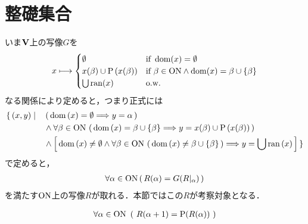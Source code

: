 \section{整礎集合}
	いま$\mathbf{V}$上の写像$G$を
	\begin{align}
		x \longmapsto
		\begin{cases}
			\emptyset & \mbox{if } \operatorname{dom}(x) = \emptyset \\
			x(\beta) \cup \operatorname*{P} \left(x(\beta)\right) & \mbox{if } \beta \in \mathrm{ON} \wedge \operatorname{dom}(x) = \beta \cup \{\beta\} \\
			\bigcup \operatorname{ran}(x) & \mathrm{o.w.}
		\end{cases}
	\end{align}
	なる関係により定めると，つまり正式には
	\begin{align}
		\{\, (x,y) \mid \quad &\left(\, \operatorname*{dom} \left(x\right) = \emptyset \Longrightarrow y = \alpha\, \right) \\
		&\wedge \forall \beta \in \mathrm{ON}\, \left(\, \operatorname*{dom} \left(x\right) = \beta \cup \{\beta\} \Longrightarrow y = x(\beta) \cup \operatorname*{P} \left(x(\beta)\right)\, \right) \\
		&\wedge \left[\, \operatorname*{dom} \left(x\right) \neq \emptyset \wedge \forall \beta \in \mathrm{ON}\, \left(\, \operatorname*{dom} \left(x\right) \neq \beta \cup \{\beta\}\, \right)
		\Longrightarrow y = \bigcup \operatorname*{ran} \left(x\right)\, \right]\, \}
	\end{align}
	で定めると，
	\begin{align}
		\forall \alpha \in \mathrm{ON}\, (\, R(\alpha) = G(R|_\alpha)\, )
	\end{align}
	を満たす$\mathrm{ON}$上の写像$R$が取れる．本節ではこの$R$が考察対象となる．
	
	\begin{screen}
		\begin{thm}
			\begin{align}\label{thm:R_alpha_plus_1_equals_to_power_of_R_alpha}
				\forall \alpha \in \ON\ 
				\left(\ R(\alpha + 1) = \operatorname{P}(R(\alpha))\ \right)
			\end{align}
		\end{thm}
	\end{screen}
	
